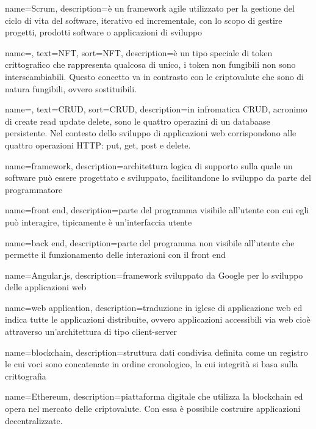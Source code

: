 {
	name={Scrum},
	description={è un framework agile utilizzato per la gestione del ciclo di vita del software, iterativo ed incrementale, con lo scopo di gestire progetti, prodotti software o applicazioni di sviluppo}
}

{
	name=,
	text=NFT,
	sort=NFT,
	description={è un tipo speciale di token crittografico che rappresenta qualcosa di unico, i token non fungibili non sono interscambiabili. Questo concetto va in contrasto con le criptovalute che sono di natura fungibili, ovvero sostituibili.}
}

{
	name=,
	text=CRUD,
	sort=CRUD,
	description={in infromatica CRUD, acronimo di create read update delete, sono le quattro operazini di un databaase persistente. Nel contesto dello sviluppo di applicazioni web corrispondono alle quattro operazioni HTTP: put, get, post e delete.}
}

{
	name={framework},
	description={architettura logica di supporto sulla quale un software può essere progettato e sviluppato, facilitandone lo sviluppo da parte del programmatore}
}

{
	name={front end},
	description={parte del programma visibile all'utente con cui egli può interagire, tipicamente è un'interfaccia utente}
}

{
	name={back end},
	description={parte del programma non visibile all'utente che permette il funzionamento delle interazioni con il front end}
}

{
	name={Angular.js},
	description={framework sviluppato da Google per lo sviluppo delle applicazioni web}
}

{
	name={web application},
	description={traduzione in iglese di applicazione web ed indica tutte le applicazioni distribuite, ovvero applicazioni accessibili via web cioè attraverso un'architettura di tipo client-server}
}

{
	name={blockchain},
	description={struttura dati condivisa definita come un registro le cui voci sono concatenate in ordine cronologico, la cui integrità si basa sulla crittografia}
}

{
	name={Ethereum},
	description={piattaforma digitale che utilizza la blockchain ed opera nel mercato delle criptovalute. Con essa è possibile costruire applicazioni decentralizzate.}
}